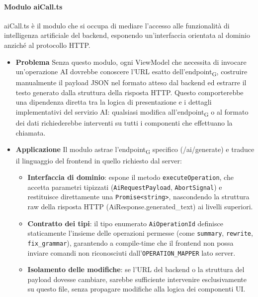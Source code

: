 \documentclass[11pt,a4paper]{article}
\newcommand{\gls}[1]{#1\textsubscript{G}}
\begin{document}
\paragraph{Modulo aiCall.ts}
aiCall.ts è il modulo che si occupa di mediare l'accesso alle funzionalità di intelligenza artificiale del backend, esponendo un'interfaccia orientata al dominio anziché al protocollo HTTP.
\begin{itemize}
\item \textbf{Problema} Senza questo modulo, ogni ViewModel che necessita di invocare un'operazione AI dovrebbe conoscere l'URL esatto dell'\gls{endpoint}, costruire manualmente il payload JSON nel formato atteso dal backend ed estrarre il testo generato dalla struttura della risposta HTTP. Questo comporterebbe una dipendenza diretta tra la logica di presentazione e i dettagli implementativi del servizio AI: qualsiasi modifica all'\gls{endpoint} o al formato dei dati richiederebbe interventi su tutti i componenti che effettuano la chiamata.
\item \textbf{Applicazione} Il modulo astrae l'\gls{endpoint} specifico (/ai/generate) e traduce il linguaggio del frontend in quello richiesto dal server:
\begin{itemize}
\item \textbf{Interfaccia di dominio}: espone il metodo \texttt{executeOperation}, che accetta parametri tipizzati (\texttt{AiRequestPayload}, \texttt{AbortSignal}) e restituisce direttamente una \texttt{Promise<string>}, nascondendo la struttura raw della risposta HTTP (AiResponse.generated\_text) ai livelli superiori.
\item \textbf{Contratto dei tipi}: il tipo enumerato \texttt{AiOperationId} definisce staticamente l'insieme delle operazioni permesse (come \texttt{summary}, \texttt{rewrite}, \texttt{fix\_grammar}), garantendo a compile-time che il frontend non possa inviare comandi non riconosciuti dall'\texttt{OPERATION\_MAPPER} lato server.
\item \textbf{Isolamento delle modifiche}: se l'URL del backend o la struttura del payload dovesse cambiare, sarebbe sufficiente intervenire esclusivamente su questo file, senza propagare modifiche alla logica dei componenti UI.
\end{itemize}
\end{itemize}
\end{document}
